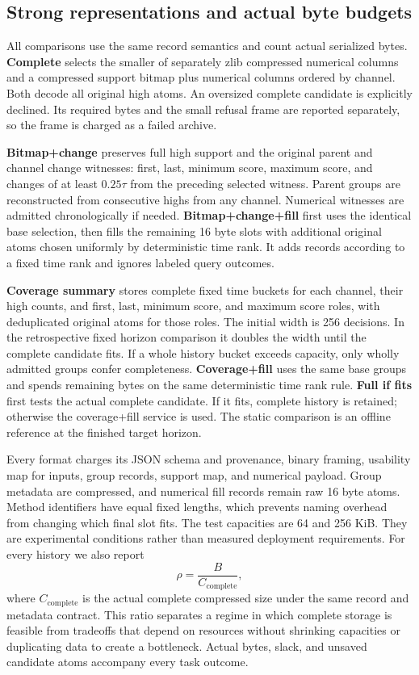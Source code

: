 \documentclass[a4paper,fleqn]{cas-dc}
\begin{document}
\subsection{Strong representations and actual byte budgets}

All comparisons use the same record semantics and count actual serialized bytes. \textbf{Complete} selects the smaller of separately zlib compressed numerical columns and a compressed support bitmap plus numerical columns ordered by channel. Both decode all original high atoms. An oversized complete candidate is explicitly declined. Its required bytes and the small refusal frame are reported separately, so the frame is charged as a failed archive.

\textbf{Bitmap+change} preserves full high support and the original parent and channel change witnesses: first, last, minimum score, maximum score, and changes of at least $0.25\tau$ from the preceding selected witness. Parent groups are reconstructed from consecutive highs from any channel. Numerical witnesses are admitted chronologically if needed. \textbf{Bitmap+change+fill} first uses the identical base selection, then fills the remaining 16 byte slots with additional original atoms chosen uniformly by deterministic time rank. It adds records according to a fixed time rank and ignores labeled query outcomes.

\textbf{Coverage summary} stores complete fixed time buckets for each channel, their high counts, and first, last, minimum score, and maximum score roles, with deduplicated original atoms for those roles. The initial width is 256 decisions. In the retrospective fixed horizon comparison it doubles the width until the complete candidate fits. If a whole history bucket exceeds capacity, only wholly admitted groups confer completeness. \textbf{Coverage+fill} uses the same base groups and spends remaining bytes on the same deterministic time rank rule. \textbf{Full if fits} first tests the actual complete candidate. If it fits, complete history is retained; otherwise the coverage+fill service is used. The static comparison is an offline reference at the finished target horizon.

Every format charges its JSON schema and provenance, binary framing, usability map for inputs, group records, support map, and numerical payload. Group metadata are compressed, and numerical fill records remain raw 16 byte atoms. Method identifiers have equal fixed lengths, which prevents naming overhead from changing which final slot fits. The test capacities are 64 and 256 KiB. They are experimental conditions rather than measured deployment requirements. For every history we also report
\begin{equation}\label{eq:rho}
\rho=\frac{B}{C_{\mathrm{complete}}},
\end{equation}
where $C_{\mathrm{complete}}$ is the actual complete compressed size under the same record and metadata contract. This ratio separates a regime in which complete storage is feasible from tradeoffs that depend on resources without shrinking capacities or duplicating data to create a bottleneck. Actual bytes, slack, and unsaved candidate atoms accompany every task outcome.
\end{document}
